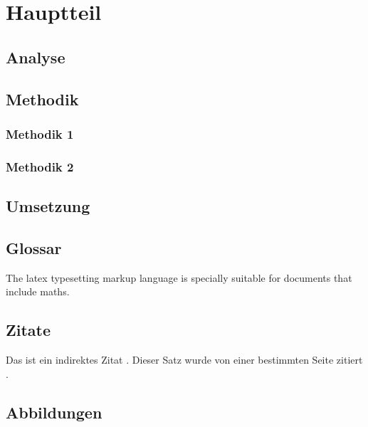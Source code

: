 \section{Hauptteil}

\subsection{Analyse}

\blindtext

\subsection{Methodik}

\blindtext

\subsubsection{Methodik 1}

\blindtext[1]

\subsubsection{Methodik 2}

\blindtext[1]

\subsection{Umsetzung}

\blindtext

\subsection{Glossar}

The \Gls{latex} typesetting markup language is specially suitable 
for documents that include \gls{maths}.

\subsection{Zitate}

Das ist ein indirektes Zitat \cite{bieg2016finanzierung}. Dieser Satz wurde von einer bestimmten Seite zitiert \cite[S. 45-47]{bieg2016finanzierung}.

\subsection{Abbildungen}

